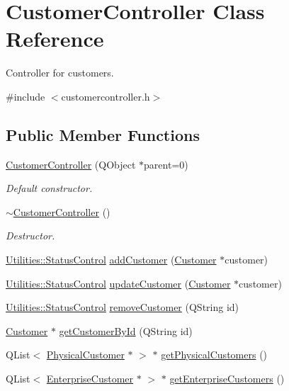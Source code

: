 \hypertarget{class_customer_controller}{\section{\-Customer\-Controller \-Class \-Reference}
\label{class_customer_controller}
}


\-Controller for customers.  




{\ttfamily \#include $<$customercontroller.\-h$>$}

\subsection*{\-Public \-Member \-Functions}
\begin{DoxyCompactItemize}
\item 
\hyperlink{class_customer_controller_a35eaf768ea1984c05f891c2914936001}{\-Customer\-Controller} (\-Q\-Object $\ast$parent=0)
\begin{DoxyCompactList}\small\item\em \-Default constructor. \end{DoxyCompactList}\item 
\hyperlink{class_customer_controller_a0d23ff9437c8bca74e3acde1315659b9}{$\sim$\-Customer\-Controller} ()
\begin{DoxyCompactList}\small\item\em \-Destructor. \end{DoxyCompactList}\item 
\hyperlink{class_utilities_a2974f062d85bdb0c444a1cbe554bf228}{\-Utilities\-::\-Status\-Control} \hyperlink{class_customer_controller_a3d4ae9bbe1403e1957a9d549f0464c4f}{add\-Customer} (\hyperlink{class_customer}{\-Customer} $\ast$customer)
\item 
\hyperlink{class_utilities_a2974f062d85bdb0c444a1cbe554bf228}{\-Utilities\-::\-Status\-Control} \hyperlink{class_customer_controller_a72d174be0a7f655286ac6f245550a30e}{update\-Customer} (\hyperlink{class_customer}{\-Customer} $\ast$customer)
\item 
\hyperlink{class_utilities_a2974f062d85bdb0c444a1cbe554bf228}{\-Utilities\-::\-Status\-Control} \hyperlink{class_customer_controller_ae905c4a18b844197839085ff3d4b1481}{remove\-Customer} (\-Q\-String id)
\item 
\hyperlink{class_customer}{\-Customer} $\ast$ \hyperlink{class_customer_controller_a54c891932e3858058916a715e5a5b81d}{get\-Customer\-By\-Id} (\-Q\-String id)
\item 
\-Q\-List$<$ \hyperlink{class_physical_customer}{\-Physical\-Customer} $\ast$ $>$ $\ast$ \hyperlink{class_customer_controller_a58e27ba08ab7c039d346f6e533fddfd7}{get\-Physical\-Customers} ()
\item 
\-Q\-List$<$ \hyperlink{class_enterprise_customer}{\-Enterprise\-Customer} $\ast$ $>$ $\ast$ \hyperlink{class_customer_controller_a21ab13374e23b22255ebf1a8d9744269}{get\-Enterprise\-Customers} ()
\end{DoxyCompactItemize}


